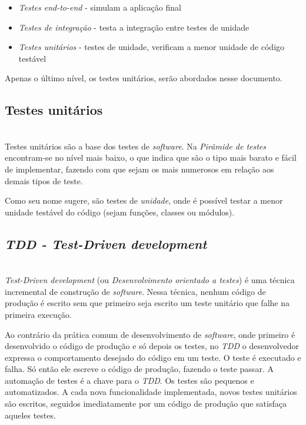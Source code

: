 \documentclass[times, twoside, watermark]{artigo}
\begin{document}
\begin{itemize}
  \item \textit{Testes end-to-end} - simulam a aplicação final
  \item \textit{Testes de integração} - testa a integração entre testes de unidade
  \item \textit{Testes unitários} - testes de unidade, verificam a menor unidade de
        código testável
\end{itemize}

Apenas o último nível, os testes unitários, serão abordados nesse documento.

\subsection{Testes unitários}\hfill\\

Testes unitários são a base dos testes de \textit{software}. Na \textit{Pirâmide de
  testes} encontram-se no nível mais baixo, o que indica que são
o tipo mais barato e fácil de implementar\cite{contan2018test},
fazendo com que sejam os mais numerosos em relação aos demais tipos de teste.

Como seu nome sugere, são testes de \textit{unidade}, onde é possível testar a
menor unidade testável do código (sejam funções, classes ou módulos).

\subsection{\textit{TDD - Test-Driven development}}\hfill\\

\textit{Test-Driven development} (ou \textit{Desenvolvimento orientado a testes}) é
uma técnica incremental de construção de \textit{software}.
Nessa técnica, nenhum código de produção é escrito sem que primeiro seja escrito um
teste unitário que falhe na primeira execução.

Ao contrário da prática comum de desenvolvimento de \textit{software}, onde primeiro
é desenvolvido o código de produção e só depois os testes, no \textit{TDD}
o desenvolvedor expressa o comportamento desejado do código em um teste.
O teste é executado e falha. Só então ele escreve o código de produção, fazendo o
teste passar.
A automação de testes é a chave para o \textit{TDD}. Os testes são pequenos e
automatizados.
A cada nova funcionalidade implementada, novos testes unitários são escritos,
seguidos imediatamente por um código de produção que satisfaça aqueles testes.
\end{document}
